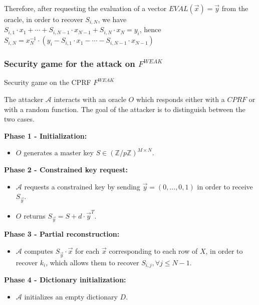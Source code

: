 \documentclass[9pt]{extarticle}
\begin{document}
Therefore, after requesting the evaluation of a vector $EVAL(\vec{x}) = \vec{y}$ from the oracle, in order to recover $S_{i,N}$, we have $S_{i,1} \cdot x_1 + \cdots + S_{i,N-1} \cdot x_{N-1} + S_{i,N} \cdot x_N = y_i$, hence
$S_{i,N} = x_N^{-1} \cdot (y_i - S_{i,1} \cdot x_1 - \cdots - S_{i,N-1} \cdot x_{N-1})$


\subsubsection{Security game for the attack on $F^{WEAK}$}

\begin{defbox}{Security game on the CPRF $F^{WEAK}$}

  The attacker $\mathcal{A}$ interacts with an oracle $O$ which responds either with a $CPRF$ or with a random function. 
  The goal of the attacker is to distinguish between the two cases.

  \medskip

  \textbf{Phase 1 - Initialization:}
  \begin{itemize}
  \item $O$ generates a master key $S \in (\mathbb{Z}/p\mathbb{Z})^{M \times N}$.
  \end{itemize}

  \medskip

  \textbf{Phase 2 - Constrained key request:}
  \begin{itemize}
  \item $\mathcal{A}$ requests a constrained key by sending $\vec{y} = (0,\ldots,0,1)$ in order to receive $S_{\vec{y}}$.
  \item $O$ returns $S_{\vec{y}} = S + d \cdot \vec{y}^T$.
  \end{itemize}

  \medskip

  \textbf{Phase 3 - Partial reconstruction:}
  \begin{itemize}
  \item $\mathcal{A}$ computes $S_{\vec{y}} \cdot \vec{x}$ for each $\vec{x}$ corresponding to each row of $X$, in order to recover $k_i$, which allows them to recover $S_{i,j}, \forall j \leq N-1$.
  \end{itemize}

  \medskip

  \textbf{Phase 4 - Dictionary initialization:}
  \begin{itemize}
  \item $\mathcal{A}$ initializes an empty dictionary $D$.
  \end{itemize}


\end{defbox}
\end{document}
